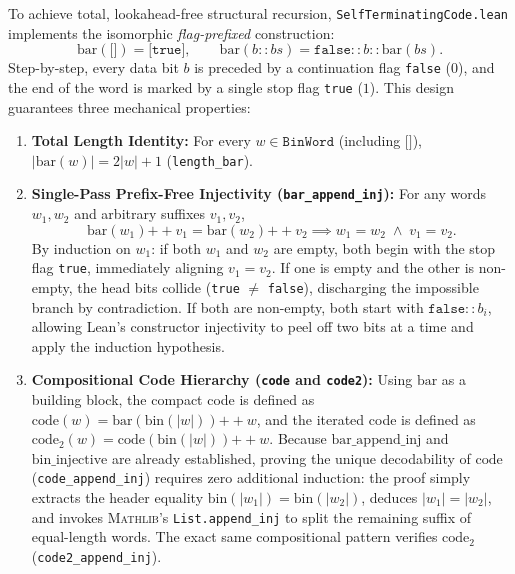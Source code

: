 \documentclass[acmsmall,natbib=false,nonacm]{acmart}
\begin{document}
To achieve total, lookahead-free structural recursion, \texttt{SelfTerminatingCode.lean} implements the isomorphic \textit{flag-prefixed} construction:
\begin{equation}
    \text{bar}(\texttt{[]}) = \texttt{[true]}, \qquad \text{bar}(b :: bs) = \texttt{false} :: b :: \text{bar}(bs).
\end{equation}
Step-by-step, every data bit $b$ is preceded by a continuation flag \texttt{false} ($0$), and the end of the word is marked by a single stop flag \texttt{true} ($1$). This design guarantees three mechanical properties:
\begin{enumerate}
    \item \textbf{Total Length Identity:} For every $w \in \texttt{BinWord}$ (including $\texttt{[]}$), $|\text{bar}(w)| = 2|w| + 1$ (\texttt{length\_bar}).
    \item \textbf{Single-Pass Prefix-Free Injectivity (\texttt{bar\_append\_inj}):} For any words $w_1, w_2$ and arbitrary suffixes $v_1, v_2$,
    \begin{equation}
        \text{bar}(w_1) \mathbin{+\!+} v_1 = \text{bar}(w_2) \mathbin{+\!+} v_2 \implies w_1 = w_2 \;\wedge\; v_1 = v_2.
    \end{equation}
    By induction on $w_1$: if both $w_1$ and $w_2$ are empty, both begin with the stop flag \texttt{true}, immediately aligning $v_1 = v_2$. If one is empty and the other is non-empty, the head bits collide (\texttt{true} $\neq$ \texttt{false}), discharging the impossible branch by contradiction. If both are non-empty, both start with $\texttt{false} :: b_i$, allowing Lean's constructor injectivity to peel off two bits at a time and apply the induction hypothesis.

    \item \textbf{Compositional Code Hierarchy (\texttt{code} and \texttt{code2}):} Using $\text{bar}$ as a building block, the compact code is defined as $\text{code}(w) = \text{bar}(\text{bin}(|w|)) \mathbin{+\!+} w$, and the iterated code is defined as $\text{code}_2(w) = \text{code}(\text{bin}(|w|)) \mathbin{+\!+} w$. Because $\text{bar\_append\_inj}$ and $\text{bin\_injective}$ are already established, proving the unique decodability of $\text{code}$ (\texttt{code\_append\_inj}) requires zero additional induction: the proof simply extracts the header equality $\text{bin}(|w_1|) = \text{bin}(|w_2|)$, deduces $|w_1| = |w_2|$, and invokes \textsc{Mathlib}'s \texttt{List.append\_inj} to split the remaining suffix of equal-length words. The exact same compositional pattern verifies $\text{code}_2$ (\texttt{code2\_\allowbreak append\_\allowbreak inj}).
\end{enumerate}
\end{document}
